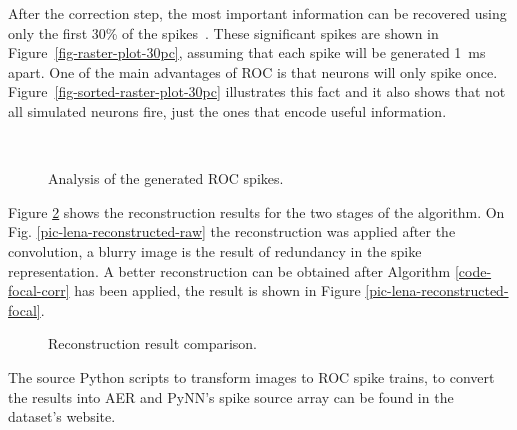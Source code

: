 After the correction step, the most important information can be recovered using only the first 30\% of the spikes~\citep{basab-model}. These significant spikes are shown in Figure~\ref{fig-raster-plot-30pc}, assuming that each spike will be generated 1~ms apart. One of the main advantages of ROC is that neurons will only spike once. Figure~\ref{fig-sorted-raster-plot-30pc} illustrates this fact and it also shows that not all simulated neurons fire, just the ones that encode useful information.
\begin{figure}[hbt]
  \centering
  \\[0.1em]
  \caption{Analysis of the generated ROC spikes.}
  \label{fig-focal-raster-spikes}
\end{figure}

Figure \ref{fig-reconstruction-results} shows the reconstruction results for the two stages of the algorithm. On Fig. \ref{pic-lena-reconstructed-raw} the reconstruction was applied after the convolution, a blurry image is the result of redundancy in the spike representation. A better reconstruction can be obtained after Algorithm \ref{code-focal-corr} has been applied, the result is shown in Figure \ref{pic-lena-reconstructed-focal}.


\begin{figure}[hbt]
  \centering
  \caption{Reconstruction result comparison.}
  \label{fig-reconstruction-results}
\end{figure}

The source Python scripts to transform images to ROC spike trains, to convert the results into AER and PyNN's spike source array can be found in the dataset's website.